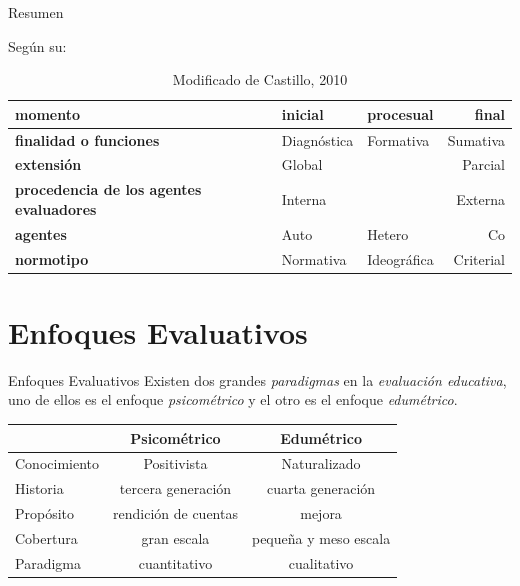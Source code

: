 \documentclass[11pt, aspectratio=169, xcolor=table,hyphens]{beamer}
\begin{document}
\begin{frame}{Resumen}

	Según su:
	\begin{table}
		\begin{tabular}{|l|llr|}
			\hline
			\textbf{momento}                                & \multicolumn{1}{l}{inicial}     & procesual   & final     \\ \hline
			\textbf{finalidad o funciones}                  & \multicolumn{1}{l}{Diagnóstica} & Formativa   & Sumativa  \\ \hline
			\textbf{extensión}                              & \multicolumn{2}{l}{Global}      & Parcial                 \\ \hline
			\textbf{procedencia de los agentes evaluadores} & \multicolumn{2}{l}{Interna}     & Externa                 \\ \hline
			\textbf{agentes}                                & \multicolumn{1}{l}{Auto}        & Hetero      & Co        \\ \hline
			\textbf{normotipo}                              & \multicolumn{1}{l}{Normativa}   & Ideográfica & Criterial \\ \hline
		\end{tabular}
		\caption{Modificado de Castillo, 2010}
	\end{table}
\end{frame}

\section{Enfoques Evaluativos}

\begin{frame}{Enfoques Evaluativos}
	Existen dos grandes \textit{paradigmas} en la \textit{evaluación educativa}, uno de ellos es el enfoque \textit{psicométrico} y el otro es el enfoque \textit{edumétrico}.

	\begin{center}
		\begin{tabular}{l!{\vrule}cc} %
			\hline
			             & \textbf{Psicométrico} & \textbf{Edumétrico}          \\ \hline
			Conocimiento & Positivista           & Naturalizado \pause          \\
			Historia     & tercera generación    & cuarta generación \pause     \\
			Propósito    & rendición de cuentas  & mejora \pause                \\
			Cobertura    & gran escala           & pequeña y meso escala \pause \\
			Paradigma    & cuantitativo          & cualitativo                  \\
			\hline
		\end{tabular}
	\end{center}
\end{frame}
\end{document}
